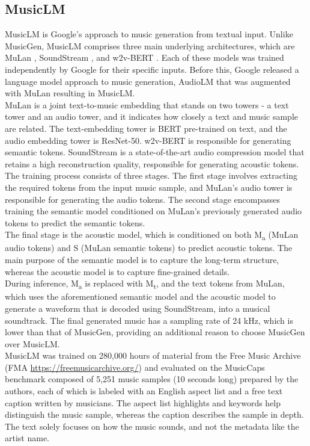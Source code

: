 \documentclass[conference]{IEEEtran}
\begin{document}
\subsection{MusicLM}
{
MusicLM \cite{agostinelli2023musiclm} is Google’s approach to music generation from textual input. Unlike MusicGen, MusicLM comprises three main underlying architectures, which are MuLan \cite{huang2022mulan}, SoundStream \cite{zeghidour2021soundstream}, and w2v-BERT \cite{chung2021w2v}. Each of these models was trained independently by Google for their specific inputs. Before this, Google released a language model approach to music generation, AudioLM \cite{borsos2023audiolm} that was augmented with MuLan resulting in MusicLM.
\\

MuLan \cite{huang2022mulan} is a joint text-to-music embedding that stands on two towers - a text tower and an audio tower, and it indicates how closely a text and music sample are related. The text-embedding tower is BERT pre-trained on text, and the audio embedding tower is ResNet-50. w2v-BERT \cite{chung2021w2v} is responsible for generating semantic tokens. SoundStream \cite{zeghidour2021soundstream} is a state-of-the-art audio compression model that retains a high reconstruction quality, responsible for generating acoustic tokens.
\\

The training process consists of three stages. The first stage involves extracting the required tokens from the input music sample, and MuLan’s audio tower is responsible for generating the audio tokens. The second stage encompasses training the semantic model conditioned on MuLan’s previously generated audio tokens to predict the semantic tokens. 
\\

The final stage is the acoustic model, which is conditioned on both M\textsubscript{a} (MuLan audio tokens) and S (MuLan semantic tokens) to predict acoustic tokens. The main purpose of the semantic model is to capture the long-term structure, whereas the acoustic model is to capture fine-grained details.
\\

During inference, M\textsubscript{a} is replaced with M\textsubscript{t}, and the text tokens from MuLan, which uses the aforementioned semantic model and the acoustic model to generate a waveform that is decoded using SoundStream, into a musical soundtrack. The final generated music has a sampling rate of 24 kHz, which is lower than that of MusicGen, providing an additional reason to choose MusicGen over MusicLM.
\\

MusicLM was trained on 280,000 hours of material from the Free Music Archive (FMA \url{https://freemusicarchive.org/}) and evaluated on the MusicCaps \cite{agostinelli2023musiclm} benchmark composed of 5,251 music samples (10 seconds long) prepared by the authors, each of which is labeled with an English aspect list and a free text caption written by musicians. The aspect list highlights and keywords help distinguish the music sample, whereas the caption describes the sample in depth. The text solely focuses on how the music sounds, and not the metadata like the artist name.
}
\end{document}
